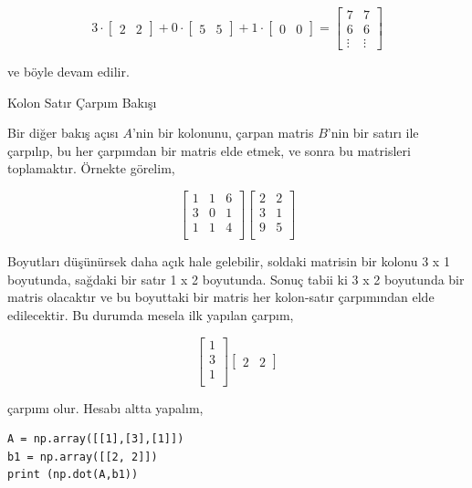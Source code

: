 \documentclass[12pt,fleqn]{article}\usepackage{../../common}
\begin{document}
$$ 
3 \cdot
\left[\begin{array}{cc}
2 & 2
\end{array}\right] +
0 \cdot
\left[\begin{array}{cc}
5 & 5
\end{array}\right] + 
1 \cdot
\left[\begin{array}{cc}
0 & 0
\end{array}\right] 
=
\left[\begin{array}{cc}
7 & 7 \\
6 & 6 \\
\vdots & \vdots
\end{array}\right] 
$$

ve böyle devam edilir.

Kolon Satır Çarpım Bakışı

Bir diğer bakış açısı $A$'nin bir kolonunu, çarpan matris $B$'nin bir satırı ile
çarpılıp, bu her çarpımdan bir matris elde etmek, ve sonra bu matrisleri
toplamaktır. Örnekte görelim,

$$
\left[\begin{array}{ccc}
1 & 1 & 6 \\
3 & 0 & 1 \\
1 & 1 & 4 \\
\end{array}\right]
\left[\begin{array}{ccc}
2 & 2  \\
3 & 1  \\
9 & 5  \\
\end{array}\right]
$$

Boyutları düşünürsek daha açık hale gelebilir, soldaki matrisin bir kolonu 3 x 1
boyutunda, sağdaki bir satır 1 x 2 boyutunda. Sonuç tabii ki 3 x 2 boyutunda bir
matris olacaktır ve bu boyuttaki bir matris her kolon-satır çarpımından elde
edilecektir. Bu durumda mesela ilk yapılan çarpım,

$$
\left[\begin{array}{ccc}
1  \\
3  \\
1  \\
\end{array}\right]
\left[\begin{array}{ccc}
2 & 2 
\end{array}\right]
$$

çarpımı olur. Hesabı altta yapalım,

\begin{verbatim}
A = np.array([[1],[3],[1]])
b1 = np.array([[2, 2]])
print (np.dot(A,b1))
\end{verbatim}
\end{document}
